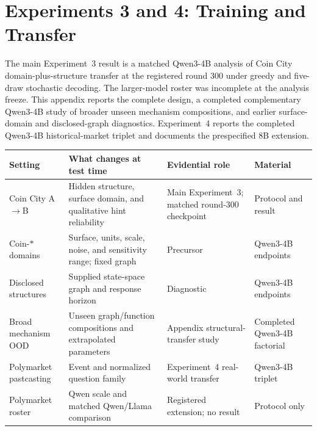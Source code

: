 
\section{Experiments 3 and 4: Training and Transfer}
\label{app:exp3}

The main Experiment~3 result is a matched Qwen3-4B analysis of Coin City
domain-plus-structure transfer at the registered round 300 under greedy and
five-draw stochastic decoding. The larger-model roster was incomplete at the
analysis freeze. This appendix reports the complete design, a completed complementary
Qwen3-4B study of broader unseen mechanism compositions, and earlier
surface-domain and disclosed-graph diagnostics. Experiment~4 reports the completed
Qwen3-4B historical-market triplet and documents the prespecified 8B extension.

\begin{center}
\begin{minipage}{\linewidth}
\centering
{}
\label{tab:exp3-roadmap}
\footnotesize
\setlength{\tabcolsep}{3pt}
\begin{tabular}{p{.19\linewidth}p{.28\linewidth}p{.31\linewidth}p{.10\linewidth}}
\toprule
Setting & What changes at test time & Evidential role & Material \\
\midrule
Coin City A$\to$B & Hidden structure, surface domain, and qualitative hint reliability & Main Experiment~3; matched round-300 checkpoint & Protocol and result \\
Coin-$*$ domains & Surface, units, scale, noise, and sensitivity range; fixed graph & Precursor & Qwen3-4B endpoints \\
Disclosed structures & Supplied state-space graph and response horizon & Diagnostic & Qwen3-4B endpoints \\
Broad mechanism OOD & Unseen graph/function compositions and extrapolated parameters & Appendix structural-transfer study & Completed Qwen3-4B factorial \\
Polymarket pastcasting & Event and normalized question family & Experiment~4 real-world transfer & Qwen3-4B triplet \\
Polymarket roster & Qwen scale and matched Qwen/Llama comparison & Registered extension; no result & Protocol only \\
\bottomrule
\end{tabular}
\end{minipage}
\end{center}

